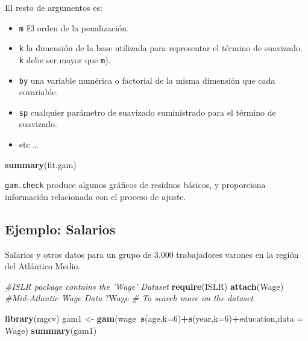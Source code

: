 \documentclass[]{book}
\newenvironment{Shaded}{\begin{snugshade}}{\end{snugshade}}
\newcommand{\KeywordTok}[1]{\textcolor[rgb]{0.13,0.29,0.53}{\textbf{#1}}}
\newcommand{\DataTypeTok}[1]{\textcolor[rgb]{0.13,0.29,0.53}{#1}}
\newcommand{\DecValTok}[1]{\textcolor[rgb]{0.00,0.00,0.81}{#1}}
\newcommand{\StringTok}[1]{\textcolor[rgb]{0.31,0.60,0.02}{#1}}
\newcommand{\CommentTok}[1]{\textcolor[rgb]{0.56,0.35,0.01}{\textit{#1}}}
\newcommand{\OperatorTok}[1]{\textcolor[rgb]{0.81,0.36,0.00}{\textbf{#1}}}
\newcommand{\NormalTok}[1]{#1}
\providecommand{\tightlist}{%
  \setlength{\itemsep}{0pt}\setlength{\parskip}{0pt}}
\begin{document}
El resto de argumentos es:

\begin{itemize}
\tightlist
\item
  \texttt{m} El orden de la penalización.
\item
  \texttt{k} la dimensión de la base utilizada para representar el
  término de suavizado. \texttt{k} debe ser mayor que \texttt{m}).
\item
  \texttt{by} una variable numérica o factorial de la misma dimensión
  que cada covariable.
\item
  \texttt{sp} cualquier parámetro de suavizado suministrado para el
  término de suavizado.
\item
  etc \ldots{}
\end{itemize}

\begin{Shaded}
\begin{Highlighting}[]
\KeywordTok{summary}\NormalTok{(fit.gam)}
\end{Highlighting}
\end{Shaded}

\texttt{gam.check} produce algunos gráficos de residuos básicos, y
proporciona información relacionada con el proceso de ajuste.

\subsection{Ejemplo: Salarios}\label{ejemplo-salarios}

Salarios y otros datos para un grupo de 3.000 trabajadores varones en la
región del Atlántico Medio.

\begin{Shaded}
\begin{Highlighting}[]
\CommentTok{#ISLR package contains the 'Wage' Dataset}
\KeywordTok{require}\NormalTok{(ISLR)}
\KeywordTok{attach}\NormalTok{(Wage) }\CommentTok{#Mid-Atlantic Wage Data}
\NormalTok{?Wage }\CommentTok{# To search more on the dataset}
\end{Highlighting}
\end{Shaded}

\begin{Shaded}
\begin{Highlighting}[]
\KeywordTok{library}\NormalTok{(mgcv)}
\NormalTok{gam1 <-}\StringTok{ }\KeywordTok{gam}\NormalTok{(wage}\OperatorTok{~}\KeywordTok{s}\NormalTok{(age,}\DataTypeTok{k=}\DecValTok{6}\NormalTok{)}\OperatorTok{+}\KeywordTok{s}\NormalTok{(year,}\DataTypeTok{k=}\DecValTok{6}\NormalTok{)}\OperatorTok{+}\NormalTok{education,}\DataTypeTok{data =}\NormalTok{ Wage)}
\KeywordTok{summary}\NormalTok{(gam1)}
\end{Highlighting}
\end{Shaded}
\end{document}
